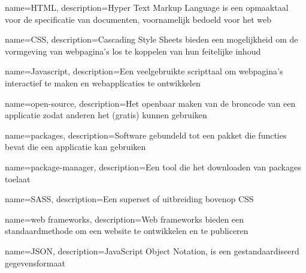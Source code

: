 

\makeglossaries

{
    name=HTML,
    description={Hyper Text Markup Language is een opmaaktaal voor de specificatie van documenten, voornamelijk bedoeld voor het web}
}

{
    name=CSS,
    description={Cascading Style Sheets bieden een mogelijkheid om de vormgeving van webpagina's los te koppelen van hun feitelijke inhoud}
}

{
    name=Javascript,
    description={Een veelgebruikte scripttaal om webpagina's interactief te maken en webapplicaties te ontwikkelen}
}

{
    name=open-source,
    description={Het openbaar maken van de broncode van een applicatie zodat anderen het (gratis) kunnen gebruiken}
}

{
    name=packages,
    description={Software gebundeld tot een pakket die functies bevat die een applicatie kan gebruiken}
}

{
    name=package-manager,
    description={Een tool die het downloaden van packages toelaat}
}

{
    name=SASS,
    description={Een superset of uitbreiding bovenop CSS}
}

{
    name=web frameworks,
    description={Web frameworks bieden een standaardmethode om een website te ontwikkelen en te publiceren}
}

{
    name=JSON,
    description={JavaScript Object Notation, is een gestandaardiseerd gegevensformaat}
}